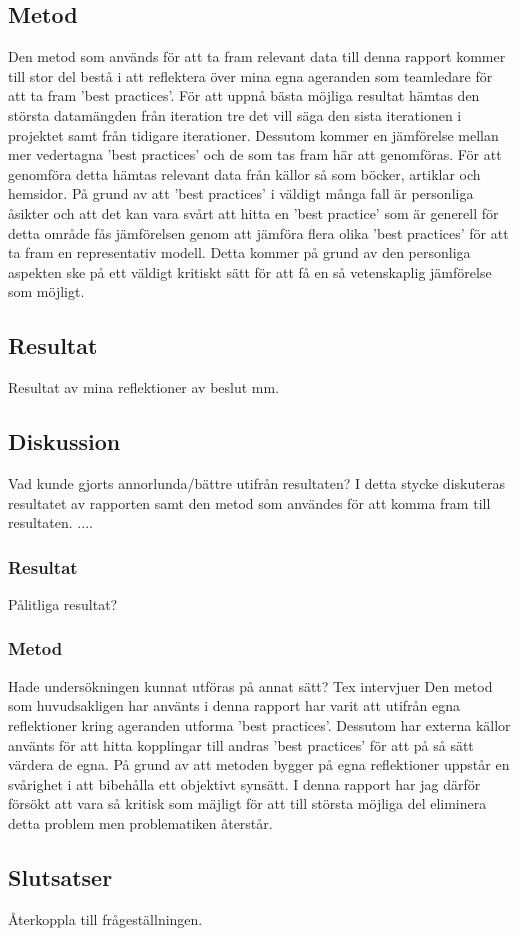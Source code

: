 \subsection{Metod}
Den metod som används för att ta fram relevant data till denna rapport kommer till stor del bestå i att reflektera över mina egna ageranden som teamledare för att ta fram 'best practices'. För att uppnå bästa möjliga resultat hämtas den största datamängden från iteration tre det vill säga den sista iterationen i projektet samt från tidigare iterationer. Dessutom kommer en jämförelse mellan mer vedertagna 'best practices' och de som tas fram här att genomföras. För att genomföra detta hämtas relevant data från källor så som böcker, artiklar och hemsidor. På grund av att 'best practices' i väldigt många fall är personliga åsikter och att det kan vara svårt att hitta en 'best practice' som är generell för detta område fås jämförelsen genom att jämföra flera olika 'best practices' för att ta fram en representativ modell. Detta kommer på grund av den personliga aspekten ske på ett väldigt kritiskt sätt för att få en så vetenskaplig jämförelse som möjligt.

\subsection{Resultat}
Resultat av mina reflektioner av beslut mm.

\subsection{Diskussion}
Vad kunde gjorts annorlunda/bättre utifrån resultaten?
\newline \newline
I detta stycke diskuteras resultatet av rapporten samt den metod som användes för att komma fram till resultaten. ....

\subsubsection{Resultat}
Pålitliga resultat? 

\subsubsection{Metod}
Hade undersökningen kunnat utföras på annat sätt?
\newline
Tex intervjuer
\newline \newline
Den metod som huvudsakligen har använts i denna rapport har varit att utifrån egna reflektioner kring ageranden utforma 'best practices'. Dessutom har externa källor använts för att hitta kopplingar till andras 'best practices' för att på så sätt värdera de egna. 
\newline \newline
På grund av att metoden bygger på egna reflektioner uppstår en svårighet i att bibehålla ett objektivt synsätt. I denna rapport har jag därför försökt att vara så kritisk som mäjligt för att till största möjliga del eliminera detta problem men problematiken återstår. 

\subsection{Slutsatser}
Återkoppla till frågeställningen.
